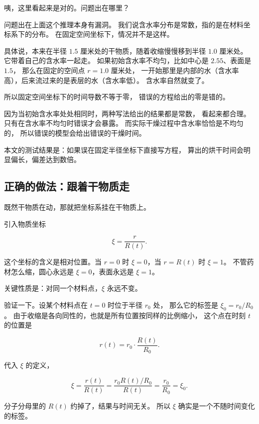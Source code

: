 咦，这里看起来是对的。问题出在哪里？

问题出在上面这个推理本身有漏洞。
我们说含水率分布是常数，指的是在材料坐标系下的分布。
在固定空间坐标下，情况并不是这样。

具体说，本来在半径 $1.5$ 厘米处的干物质，随着收缩慢慢移到半径 $1.0$ 厘米处。
它带着自己的含水率一起走。
如果初始含水率不均匀，比如中心是 $2.55$、表面是 $1.5$，
那么在固定的空间点 $r=1.0$ 厘米处，
一开始那里是内部的水（含水率高），后来流过来的是表层的水（含水率低）。
含水率自然就变了。

所以固定空间坐标下的时间导数不等于零，
错误的方程给出的零是错的。

因为当初始含水率处处相同时，两种写法给出的结果都是常数，
看起来都合理。
只有在含水率不均匀时错误才会暴露。
而实际干燥过程中含水率恰恰是不均匀的，
所以错误的模型会给出错误的干燥时间。

本文的测试结果是：如果误在固定半径坐标下直接写方程，
算出的烘干时间会明显偏长，偏差达到数倍。

\subsection{正确的做法：跟着干物质走}

既然干物质在动，那就把坐标系挂在干物质上。

引入物质坐标

\begin{equation}
\xi = \frac{r}{R(t)} .
\end{equation}

这个坐标的含义是相对位置。当 $r=0$ 时 $\xi=0$，当 $r=R(t)$ 时 $\xi=1$。
不管药材怎么缩，圆心永远是 $\xi=0$，表面永远是 $\xi=1$。

关键性质是：对同一个材料点，$\xi$ 永远不变。

验证一下。设某个材料点在 $t=0$ 时位于半径 $r_0$ 处，
那么它的标签是 $\xi_0=r_0/R_0$。
由于收缩是各向同性的，也就是所有位置按同样的比例缩小，
这个点在时刻 $t$ 的位置是

\begin{equation}
r(t) = r_0\cdot\frac{R(t)}{R_0} .
\end{equation}

代入 $\xi$ 的定义，

\begin{equation}
\xi = \frac{r(t)}{R(t)} = \frac{r_0 R(t)/R_0}{R(t)} = \frac{r_0}{R_0} = \xi_0 .
\end{equation}

分子分母里的 $R(t)$ 约掉了，结果与时间无关。
所以 $\xi$ 确实是一个不随时间变化的标签。

